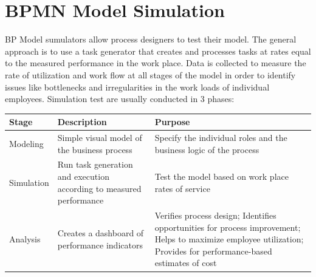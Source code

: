 \documentclass[]{book}
\begin{document}
\hypertarget{bpmn-model-simulation}{%
\section{BPMN Model Simulation}\label{bpmn-model-simulation}}

BP Model sumulators allow process designers to test their model. The general approach is to use a task generator that creates and processes tasks at rates equal to the measured performance in the work place. Data is collected to measure the rate of utilization and work flow at all stages of the model in order to identify issues like bottlenecks and irregularities in the work loads of individual employees. Simulation test are usually conducted in 3 phases:

\begin{longtable}[]{@{}lll@{}}
\toprule
\begin{minipage}[b]{0.22\columnwidth}\raggedright
Stage\strut
\end{minipage} & \begin{minipage}[b]{0.41\columnwidth}\raggedright
Description\strut
\end{minipage} & \begin{minipage}[b]{0.28\columnwidth}\raggedright
Purpose\strut
\end{minipage}\tabularnewline
\midrule
\endhead
\begin{minipage}[t]{0.22\columnwidth}\raggedright
Modeling\strut
\end{minipage} & \begin{minipage}[t]{0.41\columnwidth}\raggedright
Simple visual model of the business process\strut
\end{minipage} & \begin{minipage}[t]{0.28\columnwidth}\raggedright
Specify the individual roles and the business logic of the process\strut
\end{minipage}\tabularnewline
\begin{minipage}[t]{0.22\columnwidth}\raggedright
Simulation\strut
\end{minipage} & \begin{minipage}[t]{0.41\columnwidth}\raggedright
Run task generation and execution according to measured performance\strut
\end{minipage} & \begin{minipage}[t]{0.28\columnwidth}\raggedright
Test the model based on work place rates of service\strut
\end{minipage}\tabularnewline
\begin{minipage}[t]{0.22\columnwidth}\raggedright
Analysis\strut
\end{minipage} & \begin{minipage}[t]{0.41\columnwidth}\raggedright
Creates a dashboard of performance indicators\strut
\end{minipage} & \begin{minipage}[t]{0.28\columnwidth}\raggedright
Verifies process design; Identifies opportunities for process improvement; Helps to maximize employee utilization; Provides for performance-based estimates of cost\strut
\end{minipage}\tabularnewline
\bottomrule
\end{longtable}
\end{document}
